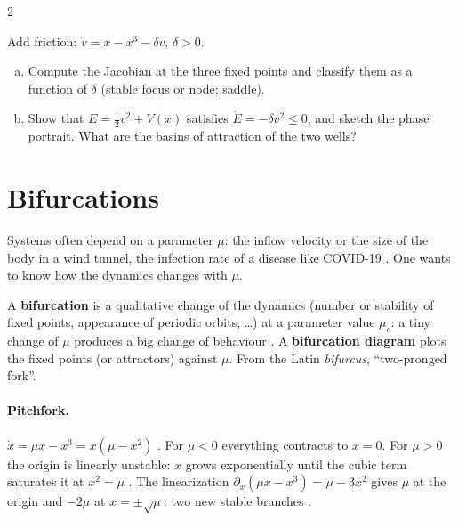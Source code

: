 \begin{paracol}{2}
\begin{exercise}
Add friction: $\dot v=x-x^3-\delta v$, $\delta>0$.
\begin{enumerate}[(a)]
  \item Compute the Jacobian at the three fixed points and classify them as a function of $\delta$
        (stable focus or node; saddle).
  \item Show that $E=\tfrac12v^2+V(x)$ satisfies $\dot E=-\delta v^2\le0$, and sketch the phase
        portrait. What are the basins of attraction of the two wells?
\end{enumerate}
\end{exercise}

\section{Bifurcations}\label{sec:fu-bifurcations}

Systems often depend on a parameter $\mu$: the inflow velocity or the size of the body in a wind
tunnel, the infection rate of a disease like COVID-19 . One wants to
know how the dynamics changes with $\mu$.

\begin{definition}
A \textbf{bifurcation} is a qualitative change of the dynamics (number or stability of fixed points,
appearance of periodic orbits, \dots) at a parameter value $\mu_c$: a tiny change of $\mu$ produces a
big change of behaviour . A \textbf{bifurcation diagram} plots the fixed points (or
attractors) against $\mu$. From the Latin \emph{bifurcus}, ``two-pronged fork''.
\end{definition}

\paragraph{Pitchfork.} $\dot x=\mu x-x^3=x(\mu-x^2)$ . For $\mu<0$ everything
contracts to $x=0$. For $\mu>0$ the origin is linearly unstable: $x$ grows exponentially until the
cubic term saturates it at $x^2=\mu$ . The linearization
$\partial_x(\mu x-x^3)=\mu-3x^2$ gives $\mu$ at the origin and $-2\mu$ at $x=\pm\sqrt\mu$: two new stable
branches .


\end{paracol}
